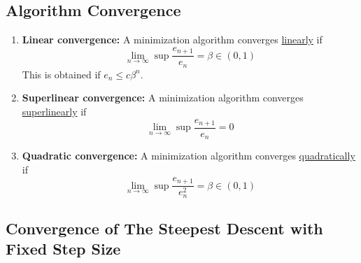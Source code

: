 \documentclass[11pt,a4paper]{article}
\begin{document}
\subsection{Algorithm Convergence}
\begin{enumerate}[(1)]
    \item \textbf{Linear convergence:} A minimization algorithm converges \underline{linearly} if $$\lim_{n \rightarrow \infty}\sup\frac{e_{n+1}}{e_n}=\beta\in (0,1)$$ This is obtained if $e_n\leq c\beta^n$.
    \item \textbf{Superlinear convergence:} A minimization algorithm converges \underline{superlinearly} if $$\lim_{n \rightarrow \infty}\sup\frac{e_{n+1}}{e_n}=0$$
    \item \textbf{Quadratic convergence:} A minimization algorithm converges \underline{quadratically} if $$\lim_{n \rightarrow \infty}\sup\frac{e_{n+1}}{e_n^2}=\beta\in (0,1)$$
\end{enumerate}

\subsection{Convergence of The Steepest Descent with Fixed Step Size}
\end{document}
